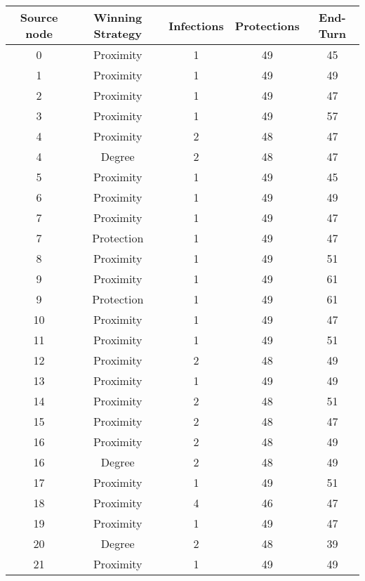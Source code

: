 \documentclass[results.tex]{subfiles}
\begin{document}
\begin{center}
  \begin{tabular}{| c || c | c | c | c |}
    \hline
    {\bfseries Source node} & {\bfseries Winning Strategy} & {\bfseries Infections} & {\bfseries Protections} & {\bfseries End-Turn} \\  %
    \hline\hline
    0 & Proximity & 1 & 49 & 45 \\ 
    \hline
    1 & Proximity & 1 & 49 & 49 \\ 
    \hline
    2 & Proximity & 1 & 49 & 47 \\ 
    \hline
    3 & Proximity & 1 & 49 & 57 \\ 
    \hline
    4 & Proximity & 2 & 48 & 47 \\ 
    \hline
    4 & Degree & 2 & 48 & 47 \\ 
    \hline
    5 & Proximity & 1 & 49 & 45 \\ 
    \hline
    6 & Proximity & 1 & 49 & 49 \\ 
    \hline
    7 & Proximity & 1 & 49 & 47 \\ 
    \hline
    7 & Protection & 1 & 49 & 47 \\ 
    \hline
    8 & Proximity & 1 & 49 & 51 \\ 
    \hline
    9 & Proximity & 1 & 49 & 61 \\ 
    \hline
    9 & Protection & 1 & 49 & 61 \\ 
    \hline
    10 & Proximity & 1 & 49 & 47 \\ 
    \hline
    11 & Proximity & 1 & 49 & 51 \\ 
    \hline
    12 & Proximity & 2 & 48 & 49 \\ 
    \hline
    13 & Proximity & 1 & 49 & 49 \\ 
    \hline
    14 & Proximity & 2 & 48 & 51 \\ 
    \hline
    15 & Proximity & 2 & 48 & 47 \\ 
    \hline
    16 & Proximity & 2 & 48 & 49 \\ 
    \hline
    16 & Degree & 2 & 48 & 49 \\ 
    \hline
    17 & Proximity & 1 & 49 & 51 \\ 
    \hline
    18 & Proximity & 4 & 46 & 47 \\ 
    \hline
    19 & Proximity & 1 & 49 & 47 \\ 
    \hline
    20 & Degree & 2 & 48 & 39 \\ 
    \hline
    21 & Proximity & 1 & 49 & 49 \\ 

\end{tabular}
\end{center}
\end{document}
